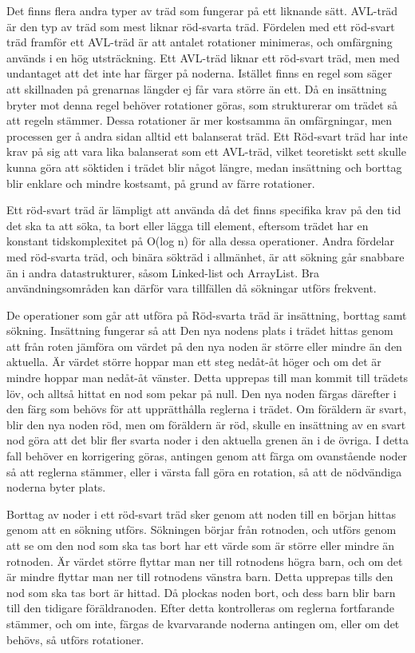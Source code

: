 \documentclass[a5paper,10pt,oneside]{article}
\begin{document}
Det finns flera andra typer av träd som fungerar på ett liknande sätt. AVL-träd är den typ av träd som mest liknar röd-svarta träd. Fördelen med ett röd-svart träd framför ett AVL-träd är att antalet rotationer minimeras, och omfärgning används i en hög utsträckning. Ett AVL-träd liknar ett röd-svart träd, men med undantaget att det inte har färger på noderna. Istället finns en regel som säger att skillnaden på grenarnas längder ej får vara större än ett. Då en insättning bryter mot denna regel behöver rotationer göras, som strukturerar om trädet så att regeln stämmer. Dessa rotationer är mer kostsamma än omfärgningar, men processen ger å andra sidan alltid ett balanserat träd. Ett Röd-svart träd har inte krav på sig att vara lika balanserat som ett AVL-träd, vilket teoretiskt sett skulle kunna göra att söktiden i trädet blir något längre, medan insättning och borttag blir enklare och mindre kostsamt, på grund av färre rotationer. 

Ett röd-svart träd är lämpligt att använda då det finns specifika krav på den tid det ska ta att söka, ta bort eller lägga till element, eftersom trädet har en konstant tidskomplexitet på O(log n) för alla dessa operationer. Andra fördelar med röd-svarta träd, och binära sökträd i allmänhet, är att sökning går snabbare än i andra datastrukturer, såsom Linked-list och ArrayList. Bra användningsområden kan därför vara tillfällen då sökningar utförs frekvent.

De operationer som går att utföra på Röd-svarta träd är insättning, borttag samt sökning. Insättning fungerar så att Den nya nodens plats i trädet hittas genom att från roten jämföra om värdet på den nya noden är större eller mindre än den aktuella. Är värdet större hoppar man ett steg nedåt-åt höger och om det är mindre hoppar man nedåt-åt vänster. Detta upprepas till man kommit till trädets löv, och alltså hittat en nod som pekar på null. Den nya noden färgas därefter i den färg som behövs för att upprätthålla reglerna i trädet. Om föräldern är svart, blir den nya noden röd, men om föräldern är röd, skulle en insättning av en svart nod göra att det blir fler svarta noder i den aktuella grenen än i de övriga. I detta fall behöver en korrigering göras, antingen genom att färga om ovanstående noder så att reglerna stämmer, eller i värsta fall göra en rotation, så att de nödvändiga noderna byter plats. 

Borttag av noder i ett röd-svart träd sker genom att noden till en början hittas genom att en sökning utförs. Sökningen börjar från rotnoden, och utförs genom att se om den nod som ska tas bort har ett värde som är större eller mindre än rotnoden. Är värdet större flyttar man ner till rotnodens högra barn, och om det är mindre flyttar man ner till rotnodens vänstra barn. Detta upprepas tills den nod som ska tas bort är hittad.  Då plockas noden bort, och dess barn blir barn till den tidigare föräldranoden. Efter detta kontrolleras om reglerna fortfarande stämmer, och om inte, färgas de kvarvarande noderna antingen om, eller om det behövs, så utförs rotationer. 
\end{document}
